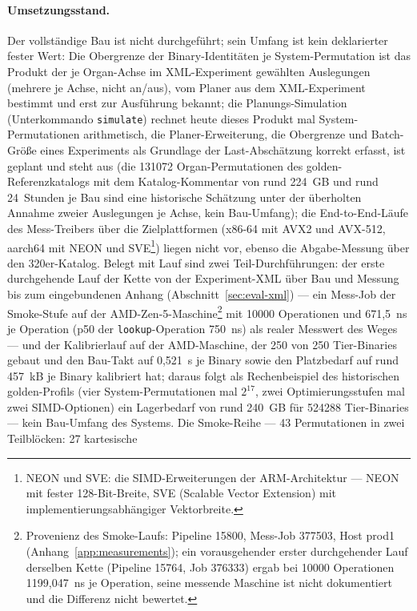 \begin{nurlang}
\paragraph{Umsetzungsstand.} Der vollständige Bau ist nicht durchgeführt; sein Umfang ist kein deklarierter
fester Wert: Die Obergrenze der Binary-Identitäten je System-Permutation ist das Produkt der je Organ-Achse im
XML-Experiment gewählten Auslegungen (mehrere je Achse, nicht an/aus), vom Planer aus dem XML-Experiment
bestimmt und erst zur Ausführung bekannt; die Planungs-Simulation (Unterkommando \texttt{simulate}) rechnet
heute dieses Produkt mal System-Permutationen arithmetisch, die Planer-Erweiterung, die Obergrenze und
Batch-Größe eines Experiments als Grundlage der Last-Abschätzung korrekt erfasst, ist geplant und steht aus
(die 131072 Organ-Permutationen des golden-Referenzkatalogs mit dem Katalog-Kommentar von rund 224~GB und rund
24~Stunden je Bau sind eine historische Schätzung unter der überholten Annahme zweier Auslegungen je Achse,
kein Bau-Umfang); die End-to-End-Läufe des
Mess-Treibers über die Zielplattformen (x86-64 mit AVX2 und AVX-512, aarch64 mit NEON und
SVE\footnote{NEON und SVE\@: die SIMD-Erweiterungen der ARM-Architektur --- NEON mit fester
128-Bit-Breite, SVE (Scalable Vector Extension) mit implementierungsabhängiger Vektorbreite.}) liegen
nicht vor, ebenso die Abgabe-Messung über den 320er-Katalog. Belegt mit Lauf sind zwei Teil-Durchführungen:
der erste durchgehende Lauf der Kette von der Experiment-XML über Bau und Messung bis zum eingebundenen Anhang
(Abschnitt~\ref{sec:eval-xml}) --- ein Mess-Job der Smoke-Stufe auf der AMD-Zen-5-Maschine\footnote{Provenienz
des Smoke-Laufs: Pipeline 15800, Mess-Job 377503, Host prod1 (Anhang~\ref{app:measurements}); ein
vorausgehender erster durchgehender Lauf derselben Kette (Pipeline 15764, Job 376333) ergab bei 10000 Operationen
1199,047~ns je Operation, seine messende Maschine ist nicht dokumentiert und die Differenz nicht
bewertet.} mit 10000 Operationen und 671,5~ns je Operation (p50 der
\texttt{lookup}-Operation 750~ns) als realer Messwert des Weges --- und der Kalibrierlauf auf der
AMD-Maschine, der 250 von 250
Tier-Binaries gebaut und den Bau-Takt auf 0,521~s je Binary sowie den Platzbedarf auf rund 457~kB je
Binary kalibriert hat; daraus folgt als Rechenbeispiel des historischen golden-Profils (vier
System-Permutationen mal $2^{17}$, zwei Optimierungsstufen mal zwei SIMD-Optionen) ein Lagerbedarf von rund
240~GB für 524288 Tier-Binaries --- kein Bau-Umfang des Systems. Die Smoke-Reihe --- 43 Permutationen in zwei Teilblöcken: 27 kartesische

\end{nurlang}
